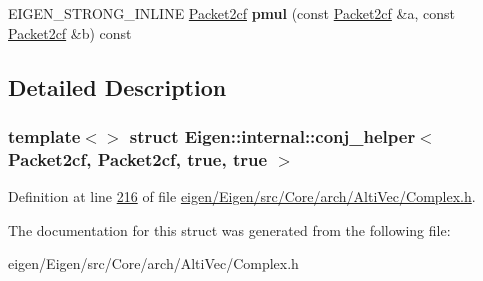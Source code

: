 \begin{DoxyCompactItemize}
\item 
\mbox{\label{struct_eigen_1_1internal_1_1conj__helper_3_01_packet2cf_00_01_packet2cf_00_01true_00_01true_01_4_a6956a6a7b0de2fd58bd9a8ab2e3c25ae}} 
E\+I\+G\+E\+N\+\_\+\+S\+T\+R\+O\+N\+G\+\_\+\+I\+N\+L\+I\+NE \hyperlink{struct_eigen_1_1internal_1_1_packet2cf}{Packet2cf} {\bfseries pmul} (const \hyperlink{struct_eigen_1_1internal_1_1_packet2cf}{Packet2cf} \&a, const \hyperlink{struct_eigen_1_1internal_1_1_packet2cf}{Packet2cf} \&b) const
\end{DoxyCompactItemize}


\subsection{Detailed Description}
\subsubsection*{template$<$$>$\newline
struct Eigen\+::internal\+::conj\+\_\+helper$<$ Packet2cf, Packet2cf, true, true $>$}



Definition at line \hyperlink{eigen_2_eigen_2src_2_core_2arch_2_alti_vec_2_complex_8h_source_l00216}{216} of file \hyperlink{eigen_2_eigen_2src_2_core_2arch_2_alti_vec_2_complex_8h_source}{eigen/\+Eigen/src/\+Core/arch/\+Alti\+Vec/\+Complex.\+h}.



The documentation for this struct was generated from the following file\+:\begin{DoxyCompactItemize}
\item 
eigen/\+Eigen/src/\+Core/arch/\+Alti\+Vec/\+Complex.\+h\end{DoxyCompactItemize}
